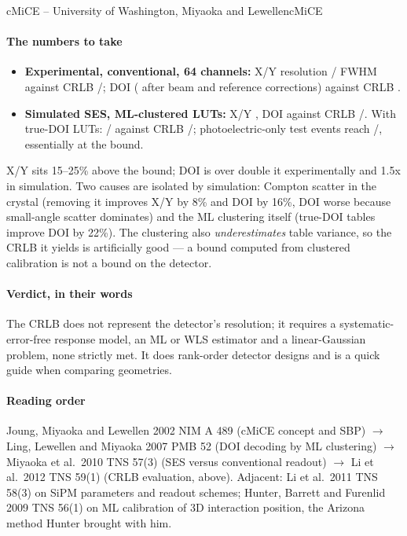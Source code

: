 \begin{programnote}{cMiCE -- University of Washington, Miyaoka and Lewellen}{cMiCE}
\paragraph{The numbers to take}
\begin{itemize}
	\item \textbf{Experimental, conventional, 64 channels:} X/Y resolution
		/ FWHM against CRLB /; DOI 
		( after beam and reference corrections) against CRLB .
	\item \textbf{Simulated SES, ML-clustered LUTs:} X/Y , DOI 
		against CRLB /. With true-DOI LUTs: /
		against CRLB /; photoelectric-only test events reach
		/, essentially at the bound.
\end{itemize}
X/Y sits 15--25\% above the bound; DOI is over double it experimentally and
1.5x in simulation. Two causes are isolated by simulation: Compton scatter in the
crystal (removing it improves X/Y by 8\% and DOI by 16\%, DOI worse because
small-angle scatter dominates) and the ML clustering itself (true-DOI tables
improve DOI by 22\%). The clustering also \emph{underestimates} table variance,
so the CRLB it yields is artificially good --- a bound computed from clustered
calibration is not a bound on the detector.

\paragraph{Verdict, in their words}
The CRLB does not represent the detector's resolution; it requires a
systematic-error-free response model, an ML or WLS estimator and a
linear-Gaussian problem, none strictly met. It does rank-order detector designs
and is a quick guide when comparing geometries. 

\paragraph{Reading order}
Joung, Miyaoka and Lewellen 2002 NIM A 489 (cMiCE concept and SBP)
$\rightarrow$ Ling, Lewellen and Miyaoka 2007 PMB 52 (DOI decoding by ML
clustering) $\rightarrow$ Miyaoka et al.\ 2010 TNS 57(3) (SES versus
conventional readout) $\rightarrow$ Li et al.\ 2012 TNS 59(1) (CRLB evaluation,
above). Adjacent: Li et al.\ 2011 TNS 58(3) on SiPM parameters and readout
schemes; Hunter, Barrett and Furenlid 2009 TNS 56(1) on ML calibration of 3D
interaction position, the Arizona method Hunter brought with him.

\end{programnote}


